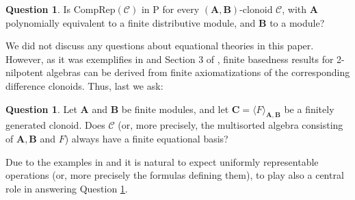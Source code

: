 \documentclass[11pt]{amsart}
\theoremstyle{plain}
\theoremstyle{definition}
\newtheorem{question}[thm]{Question}
\newcommand{\alg}[1]{\mathbf{#1}}
\newcommand{\clone}[1]{\mathcal{#1}}
\newcommand{\clonoid}[1]{\mathcal{#1}}
\newcommand{\clodC}{\clonoid{C}}
\newcommand{\algA}{\alg{A}}
\newcommand{\algB}{\alg{B}}
\newcommand{\algC}{\alg{C}}
\newcommand{\cloC}{\clone{C}}
\begin{document}
\begin{question}
Is $\mathrm{CompRep}(\clodC)$ in P for every $(\algA,\algB)$-clonoid $\cloC$, with $\algA$ polynomially equivalent to a finite distributive module, and $\algB$ to a module?
\end{question}

We did not discuss any questions about equational theories in this paper. However, as it was exemplifies in \cite{mayr-VLloop} and Section 3 of \cite{KompatscherMayr2026}, finite basedness results for 2-nilpotent algebras can be derived from finite axiomatizations of the corresponding difference clonoids. Thus, last we ask:

\begin{question} \label{question:finitebasis}
Let $\algA$ and $\algB$ be finite modules, and let $\algC = \langle F \rangle_{\algA,\algB}$ be a finitely generated clonoid. Does $\clodC$ (or, more precisely, the multisorted algebra consisting of $\algA,\algB$ and $F$) always have a finite equational basis?
\end{question}

Due to the examples in \cite{mayr-VLloop} and \cite{KompatscherMayr2026} it is natural to expect uniformly representable operations (or, more precisely the formulas defining them), to play also a central role in answering Question \ref{question:finitebasis}.



\end{document}

